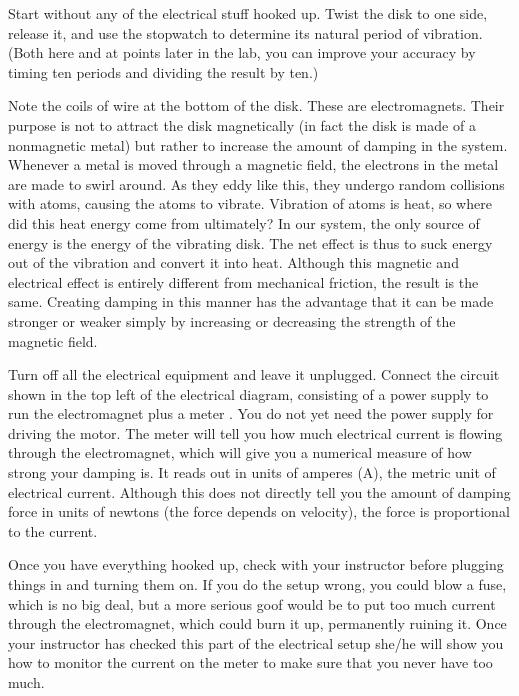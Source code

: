 \observations


Start without any of the electrical stuff hooked up. Twist
the disk to one side, release it, and use the stopwatch to
determine its natural period of vibration. (Both here and at
points later in the lab, you can improve your accuracy by
timing ten periods and dividing the result by ten.) 


Note the coils of wire at the bottom of the disk. These are
electromagnets. Their purpose is not to attract the disk
magnetically (in fact the disk is made of a nonmagnetic
metal) but rather to increase the amount of damping in the
system. Whenever a metal is moved through a magnetic field,
the electrons in the metal are made to swirl around. As they
eddy like this, they undergo random collisions with atoms,
causing the atoms to vibrate. Vibration of atoms is heat, so
where did this heat energy come from ultimately? In our
system, the only source of energy is the energy of the
vibrating disk. The net effect is thus to suck energy out of
the vibration and convert it into heat. Although this
magnetic and electrical effect is entirely different from
mechanical friction, the result is the same. Creating
damping in this manner has the advantage that it can be made
stronger or weaker simply by increasing or decreasing the
strength of the magnetic field.

Turn off all the electrical equipment and leave it
unplugged. Connect the circuit shown in the top left of the
electrical diagram, consisting of a power supply to run the
electromagnet plus a meter . You do not yet need the power
supply for driving the motor. The meter will tell you how
much electrical current is flowing through the electromagnet,
which will give you a numerical measure of how strong your
damping is. It reads out in units of amperes (A), the metric
unit of electrical current. Although this does not directly
tell you the amount of damping force in units of newtons
(the force depends on velocity), the force is proportional to the current.

Once you have everything hooked up, check with your
instructor before plugging things in and turning them on. If
you do the setup wrong, you could blow a fuse, which is no
big deal, but a more serious goof would be to put too much
current through the electromagnet, which could burn it up,
permanently ruining it. Once your instructor has checked
this part of the electrical setup she/he will show you how
to monitor the current on the meter to make sure that you
never have too much.

